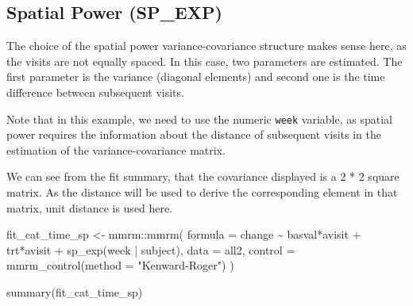 \documentclass[
  letterpaper,
  DIV=11,
  numbers=noendperiod]{scrreprt}
\newenvironment{Shaded}{\begin{snugshade}}{\end{snugshade}}
\newcommand{\AttributeTok}[1]{\textcolor[rgb]{0.40,0.45,0.13}{#1}}
\newcommand{\FunctionTok}[1]{\textcolor[rgb]{0.28,0.35,0.67}{#1}}
\newcommand{\NormalTok}[1]{\textcolor[rgb]{0.00,0.23,0.31}{#1}}
\newcommand{\OtherTok}[1]{\textcolor[rgb]{0.00,0.23,0.31}{#1}}
\newcommand{\SpecialCharTok}[1]{\textcolor[rgb]{0.37,0.37,0.37}{#1}}
\newcommand{\StringTok}[1]{\textcolor[rgb]{0.13,0.47,0.30}{#1}}
\begin{document}
\hypertarget{spatial-power-sp_exp}{%
\subsection{Spatial Power (SP\_EXP)}\label{spatial-power-sp_exp}}

The choice of the spatial power variance-covariance structure makes
sense here, as the visits are not equally spaced. In this case, two
parameters are estimated. The first parameter is the variance (diagonal
elements) and second one is the time difference between subsequent
visits.

Note that in this example, we need to use the numeric \texttt{week}
variable, as spatial power requires the information about the distance
of subsequent visits in the estimation of the variance-covariance
matrix.

We can see from the fit summary, that the covariance displayed is a 2 *
2 square matrix. As the distance will be used to derive the
corresponding element in that matrix, unit distance is used here.

\begin{Shaded}
\begin{Highlighting}[]
\NormalTok{fit\_cat\_time\_sp }\OtherTok{\textless{}{-}}\NormalTok{ mmrm}\SpecialCharTok{::}\FunctionTok{mmrm}\NormalTok{(}
  \AttributeTok{formula =}\NormalTok{ change }\SpecialCharTok{\textasciitilde{}}\NormalTok{ basval}\SpecialCharTok{*}\NormalTok{avisit }\SpecialCharTok{+}\NormalTok{ trt}\SpecialCharTok{*}\NormalTok{avisit }\SpecialCharTok{+} \FunctionTok{sp\_exp}\NormalTok{(week }\SpecialCharTok{|}\NormalTok{ subject),}
  \AttributeTok{data =}\NormalTok{ all2,}
  \AttributeTok{control =} \FunctionTok{mmrm\_control}\NormalTok{(}\AttributeTok{method =} \StringTok{"Kenward{-}Roger"}\NormalTok{)}
\NormalTok{)}

\FunctionTok{summary}\NormalTok{(fit\_cat\_time\_sp)}
\end{Highlighting}
\end{Shaded}
\end{document}
